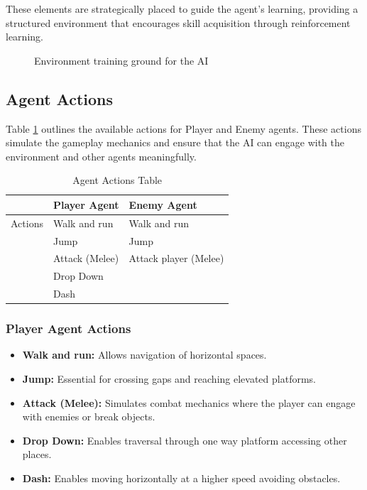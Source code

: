 \documentclass[12pt,oneside,openright,a4paper]{cpe-english-project}
\begin{document}
These elements are strategically placed to guide the agent’s learning, providing a structured environment that encourages skill acquisition through reinforcement learning.
\begin{figure}[H]
\centering
{}
\caption{Environment training ground for the AI}\label{fig:EnvironmentDesign}
\end{figure}
\subsection{Agent Actions}
Table \ref{tbl:Agent Actions Table} outlines the available actions for Player and Enemy agents. These actions simulate the gameplay mechanics and ensure that the AI can engage with the environment and other agents meaningfully.
\begin{table}[H]
\caption{Agent Actions Table}\label{tbl:Agent Actions Table}
\begin{tabular}{|l|l|l|} \hline
& \textbf{Player Agent} & \textbf{Enemy Agent} \\ \hline
Actions & Walk and run & Walk and run \\ 
& Jump & Jump \\ 
& Attack (Melee) & Attack player (Melee)  \\ 
& Drop Down &  \\
& Dash &  \\ \hline
\end{tabular}
\end{table}
\subsubsection{Player Agent Actions}
\begin{itemize}
\item  \textbf{Walk and run:} Allows navigation of horizontal spaces.
\item  \textbf{Jump:} Essential for crossing gaps and reaching elevated platforms.
\item  \textbf{Attack (Melee):} Simulates combat mechanics where the player can engage with enemies or break objects.
\item  \textbf{Drop Down:} Enables traversal through one way platform accessing other places.
\item  \textbf{Dash:} Enables moving horizontally at a higher speed avoiding obstacles.
\end{itemize}
\end{document}
